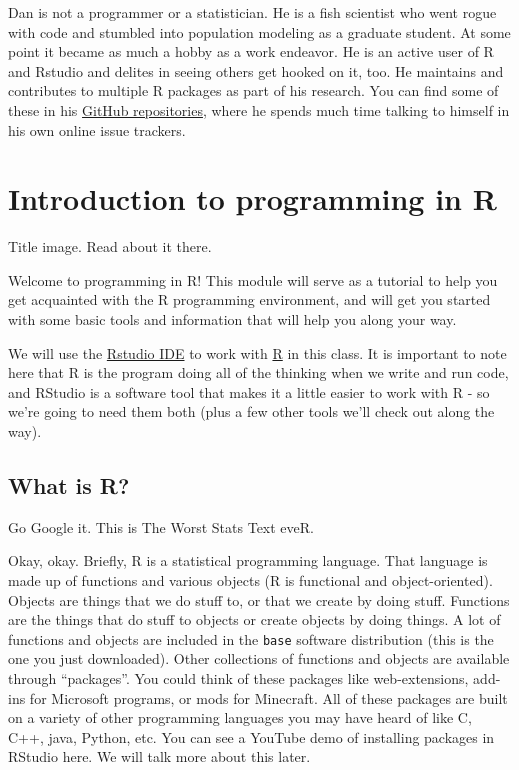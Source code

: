 \documentclass[
]{book}
\begin{document}
Dan is not a programmer or a statistician. He is a fish scientist who went rogue with code and stumbled into population modeling as a graduate student. At some point it became as much a hobby as a work endeavor. He is an active user of R and Rstudio and delites in seeing others get hooked on it, too. He maintains and contributes to multiple R packages as part of his research. You can find some of these in his \href{https://github.com/danStich}{GitHub repositories}, where he spends much time talking to himself in his own online issue trackers.

\hypertarget{Chapter1}{%
\chapter{Introduction to programming in R}\label{Chapter1}}

Title image. Read about it \protect\hypertarget{title}{}{there}.

Welcome to programming in R! This module will serve as a tutorial to help you get acquainted with the R programming environment, and will get you started with some basic tools and information that will help you along your way.

We will use the \href{https://rstudio.com/}{Rstudio IDE} to work with \href{https://www.r-project.org/}{R} in this class. It is important to note here that R is the program doing all of the thinking when we write and run code, and RStudio is a software tool that makes it a little easier to work with R - so we're going to need them both (plus a few other tools we'll check out along the way).

\hypertarget{what-is-r}{%
\section{What is R?}\label{what-is-r}}

Go Google it. This is The Worst Stats Text eveR.

Okay, okay. Briefly, R is a statistical programming language. That language is made up of functions and various objects (R is functional and object-oriented). Objects are things that we do stuff to, or that we create by doing stuff. Functions are the things that do stuff to objects or create objects by doing things. A lot of functions and objects are included in the \texttt{base} software distribution (this is the one you just downloaded). Other collections of functions and objects are available through ``packages''. You could think of these packages like web-extensions, add-ins for Microsoft programs, or mods for Minecraft. All of these packages are built on a variety of other programming languages you may have heard of like C, C++, java, Python, etc. You can see a YouTube demo of installing packages in RStudio here. We will talk more about this later.
\end{document}
